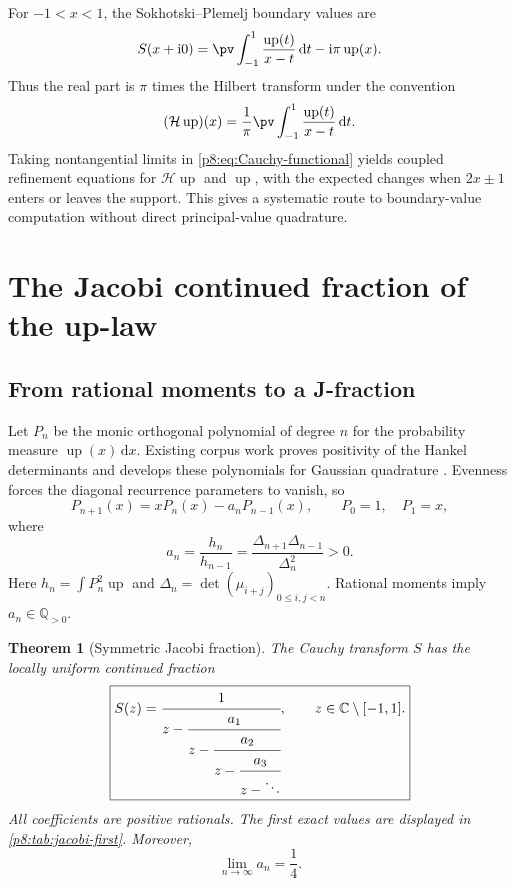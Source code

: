 \documentclass[11pt,oneside]{article}
\newtheorem{theorem}{Theorem}[section]
\theoremstyle{definition}
\theoremstyle{remark}
\newcommand{\Up}{\operatorname{up}}
\newcommand{\C}{\mathbb C}
\newcommand{\dd}{\,\mathrm d}
\newcommand{\ii}{\mathrm i}
\newcommand{\1}{\mathbf 1}
\begin{document}
For \(-1<x<1\), the Sokhotski--Plemelj boundary values are
\begin{equation}
 S(x+\ii0)
 =\pv\int_{-1}^1\frac{\Up(t)}{x-t}\dd t-\ii\pi\Up(x).
 \label{p8:eq:Plemelj}
\end{equation}
Thus the real part is \(\pi\) times the Hilbert transform under the convention
\begin{equation}
 (\mathcal H\Up)(x)=\frac1\pi\pv\int_{-1}^1\frac{\Up(t)}{x-t}\dd t.
 \label{p8:eq:Hilbert-def}
\end{equation}
Taking nontangential limits in \eqref{p8:eq:Cauchy-functional} yields coupled
refinement equations for \(\mathcal H\Up\) and \(\Up\), with the expected
changes when \(2x\pm1\) enters or leaves the support.  This gives a systematic
route to boundary-value computation without direct principal-value quadrature.

\section{The Jacobi continued fraction of the up-law}
\label{p8:sec:jacobi}

\subsection{From rational moments to a J-fraction}

Let \(P_n\) be the monic orthogonal polynomial of degree \(n\) for the
probability measure \(\Up(x)\dd x\).  Existing corpus work proves positivity of
the Hankel determinants and develops these polynomials for Gaussian quadrature
\cite{p8:proveitQuadrature}.  Evenness forces the diagonal recurrence parameters
to vanish, so
\begin{equation}
 P_{n+1}(x)=xP_n(x)-a_nP_{n-1}(x),
 \qquad P_0=1,\quad P_1=x,
 \label{p8:eq:monic-recurrence}
\end{equation}
where
\begin{equation}
 a_n=\frac{h_n}{h_{n-1}}
 =\frac{\Delta_{n+1}\Delta_{n-1}}{\Delta_n^2}>0.
 \label{p8:eq:an-Hankel}
\end{equation}
Here \(h_n=\int P_n^2\Up\) and
\(\Delta_n=\det(\mu_{i+j})_{0\le i,j<n}\).  Rational moments imply
\(a_n\in\mathbb Q_{>0}\).

\begin{theorem}[Symmetric Jacobi fraction]
\label{p8:thm:Jfraction}
The Cauchy transform \(S\) has the locally uniform continued fraction
\begin{equation}
 \boxed{
 S(z)=\cfrac{1}{z-\cfrac{a_1}{z-\cfrac{a_2}{z-\cfrac{a_3}{z-\ddots}}}},
 \qquad z\in\C\setminus[-1,1].}
 \label{p8:eq:Jfraction}
\end{equation}
All coefficients are positive rationals.  The first exact values are displayed
in \cref{p8:tab:jacobi-first}.  Moreover,
\begin{equation}
 \boxed{\lim_{n\to\infty}a_n=\frac14.}
 \label{p8:eq:an-limit}
\end{equation}
\statusprovedPartll
\end{theorem}
\end{document}
